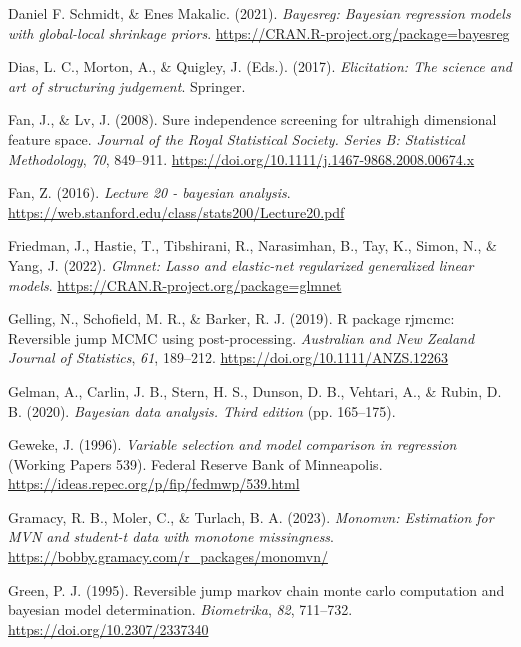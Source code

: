 \documentclass[
  11pt,
]{article}
\newlength{\cslhangindent}
\newlength{\cslentryspacingunit} %
\newenvironment{CSLReferences}[2] %
 {%
  \setlength{\parindent}{0pt}
  \ifodd #1
  \let\oldpar\par
  \def\par{\hangindent=\cslhangindent\oldpar}
  \fi
  \setlength{\parskip}{#2\cslentryspacingunit}
 }%
 {}
\begin{document}
\begin{CSLReferences}{1}{0}
\leavevmode{}%
Daniel F. Schmidt, \& Enes Makalic. (2021). \emph{Bayesreg: Bayesian
regression models with global-local shrinkage priors}.
\url{https://CRAN.R-project.org/package=bayesreg}

\leavevmode{}%
Dias, L. C., Morton, A., \& Quigley, J. (Eds.). (2017).
\emph{Elicitation: The science and art of structuring judgement}.
Springer.

\leavevmode{}%
Fan, J., \& Lv, J. (2008). Sure independence screening for ultrahigh
dimensional feature space. \emph{Journal of the Royal Statistical
Society. Series B: Statistical Methodology}, \emph{70}, 849--911.
\url{https://doi.org/10.1111/j.1467-9868.2008.00674.x}

\leavevmode{}%
Fan, Z. (2016). \emph{Lecture 20 - bayesian analysis}.
\url{https://web.stanford.edu/class/stats200/Lecture20.pdf}

\leavevmode{}%
Friedman, J., Hastie, T., Tibshirani, R., Narasimhan, B., Tay, K.,
Simon, N., \& Yang, J. (2022). \emph{Glmnet: Lasso and elastic-net
regularized generalized linear models}.
\url{https://CRAN.R-project.org/package=glmnet}

\leavevmode{}%
Gelling, N., Schofield, M. R., \& Barker, R. J. (2019). R package
rjmcmc: Reversible jump MCMC using post-processing. \emph{Australian and
New Zealand Journal of Statistics}, \emph{61}, 189--212.
\url{https://doi.org/10.1111/ANZS.12263}

\leavevmode{}%
Gelman, A., Carlin, J. B., Stern, H. S., Dunson, D. B., Vehtari, A., \&
Rubin, D. B. (2020). \emph{Bayesian data analysis. Third edition} (pp.
165--175).

\leavevmode{}%
Geweke, J. (1996). \emph{Variable selection and model comparison in
regression} (Working Papers 539). Federal Reserve Bank of Minneapolis.
\url{https://ideas.repec.org/p/fip/fedmwp/539.html}

\leavevmode{}%
Gramacy, R. B., Moler, C., \& Turlach, B. A. (2023). \emph{Monomvn:
Estimation for MVN and student-t data with monotone missingness}.
\url{https://bobby.gramacy.com/r_packages/monomvn/}

\leavevmode{}%
Green, P. J. (1995). Reversible jump markov chain monte carlo
computation and bayesian model determination. \emph{Biometrika},
\emph{82}, 711--732. \url{https://doi.org/10.2307/2337340}


\end{CSLReferences}
\end{document}
